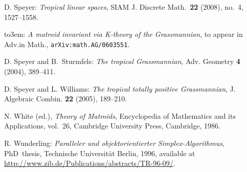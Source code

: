 \documentclass[12pt,a4paper]{amsart}
\theoremstyle{definition}
\providecommand{\bysame}{\leavevmode\hbox to3em{\hrulefill}\thinspace}
\begin{document}
\begin{thebibliography}{2}
 D. Speyer: \emph{Tropical linear spaces}, SIAM J.
  Discrete Math.\ \textbf{22} (2008), no.~4, 1527--1558.

 \bysame: \emph{A matroid invariant via K-theory
of the Grassmannian}, to appear in Adv.in Math., \texttt{arXiv:math.AG/0603551}.

 D. Speyer and B.~Sturmfels:
\emph{The tropical Grassmannian}, {Adv. Geometry} \textbf{4} (2004), 389--411.

 D. Speyer and L. Williams:
\emph{The tropical totally positive Grassmannian},
{J. Algebraic Combin.} \textbf{22} (2005), 189--210.

N. White (ed.), \emph{Theory of Matroids}, Encyclopedia of Mathematics and
  its Applications, vol.~26, Cambridge University Press, Cambridge, 1986.

 R. Wunderling:
\emph{Paralleler und objektorientierter {S}implex-{A}lgorithmus}, PhD~thesis,
  Technische Universit{\"a}t Berlin, 1996, available at
  \url{http://www.zib.de/Publications/abstracts/TR-96-09/}.

\end{thebibliography}

\bigskip
\end{document}

